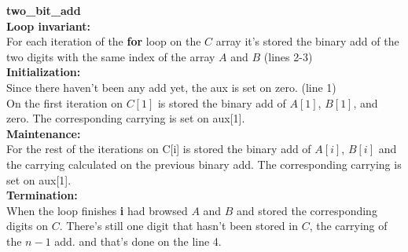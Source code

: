 \documentclass[12pt, twoside, a4paper]{article}
\begin{document}
  \vspace{1cm} 
  \textbf{two\_bit\_add}\\
  \textbf{Loop invariant:}\\
  For each iteration of the \textbf{for} loop on the $C$ array it's stored the binary add of the two digits with the same index of the array $A$ and $B$ (lines 2-3)\\
  \textbf{Initialization:} \\
  Since there haven't been any add yet, the aux is set on zero. (line 1)\\
  On the first iteration on $C[1]$ is stored the binary add of $A[1]$, $B[1]$, and zero. The corresponding carrying is set on aux[1].\\
  \textbf{Maintenance:} \\
  For the rest of the iterations on C[i] is stored the binary add of $A[i]$, $B[i]$ and the carrying calculated on the previous binary add. The corresponding carrying is set on aux[1].\\
  \textbf{Termination:}\\
  When the loop finishes \textbf{i} had browsed $A$ and $B$ and stored the corresponding digits on $C$. There's still one digit that hasn't been stored in $C$, the carrying of the $n-1$ add. and that's done on the line 4.
\end{document}

